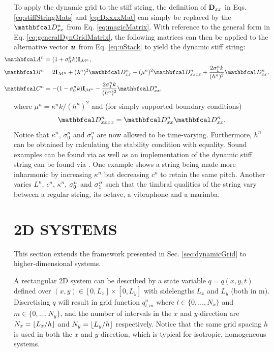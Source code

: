 \documentclass[fleqn]{jaes}
\begin{document}
To apply the dynamic grid to the stiff string, the definition of $\mathbf{D}_{xx}$ in Eqs. \eqref{eq:stiffStringMats} and \eqref{eq:DxxxxMat} can simply be replaced by the $\DDxx$ from Eq. \eqref{eq:magicMatrix}. With reference to the general form in Eq. \eqref{eq:generalDynGridMatrix}, the following matrices can then be applied to the alternative vector $\boldsymbol{u}$ from Eq. \eqref{eq:uStack} to yield the dynamic stiff string:
\begin{equation}\label{eq:stiffStringDynMatrix}
\begin{aligned}
    \!\!\!\!\!\!\!\!\!\!\AA &= (1 + \sigma_0^nk)\I_{\MoneD},\\
    \!\!\!\!\!\!\!\!\!\!\BB &= 2\I_{\MoneD} + (\lambda^n)^2 \DDxx - (\mu^n)^2 \DDxxxx + \frac{2\sigma_1^nk}{(h^n)^2}\DDxx,\\
    \!\!\!\!\!\!\!\!\!\!\CC &= -(1 - \sigma_0^nk)\I_{\MoneD} - \frac{2\sigma_1^nk}{(h^n)^2}\DDxx,
\end{aligned}
\end{equation}
where $\mu^n = \kappa^n k/(h^n)^2$ and (for simply supported boundary conditions) 
\begin{equation}\label{eq:4thOrder1D}
    \DDxxxx = \DDxx\DDxx.
\end{equation}
Notice that $\kappa^n$, $\sigma_0^n$ and $\sigma_1^n$ are now allowed to be time-varying. Furthermore, $h^n$ can be obtained by calculating the stability condition with equality. %
Sound examples can be found via as well as an implementation of the dynamic stiff string can be found via \cite{soundExamples}. One example shows a string being made more inharmonic by increasing $\kappa^n$ but decreasing $c^n$ to retain the same pitch. Another varies $L^n$, $c^n$, $\kappa^n$, $\sigma_{0}^n$ and $\sigma_{1}^n$ such that the timbral qualities of the string vary between a regular string, its octave, a vibraphone and a marimba.
\section{2D SYSTEMS}\label{sec:2D}
This section extends the framework presented in Sec. \ref{sec:dynamicGrid} to higher-dimensional systems. 

A rectangular 2D system can be described by a state variable $q = q(x,y,t)$ defined over $(x ,y) \in [0, L_x] \times [0, L_y]$ with sidelengths $L_x$ and $L_y$ (both in m). Discretising $q$ will result in grid function $q_{l,m}^n$ where $l \in \{0, \hdots, N_x\}$ and $m \in \{0, \hdots, N_y\}$, and the number of intervals in the $x$ and $y$-direction are $N_x = \floor[L_x/h]$ and $N_y = \floor[L_y/h]$ respectively. Notice that the same grid spacing $h$ is used in both the $x$ and $y$-direction, which is typical for isotropic, homogeneous systems.
\end{document}
